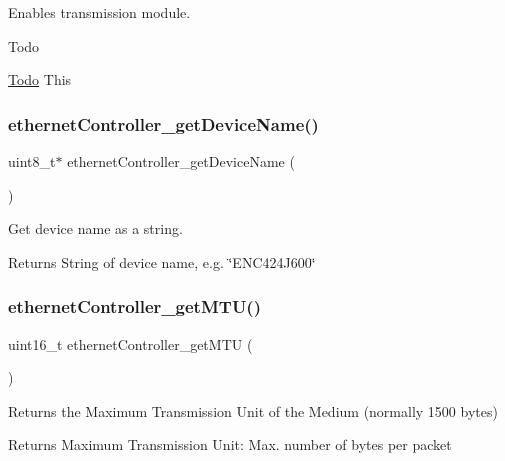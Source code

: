 Enables transmission module. 

\begin{DoxyRefDesc}{Todo}
\item[\mbox{\hyperlink{todo__todo000008}{Todo}}]This \end{DoxyRefDesc}
\mbox{\label{group__init_gae396f51c0fdba634e4e84b5f2b5d9416}} 
\subsubsection{\texorpdfstring{ethernetController\_getDeviceName()}{ethernetController\_getDeviceName()}}
{\footnotesize\ttfamily uint8\+\_\+t$\ast$ ethernet\+Controller\+\_\+get\+Device\+Name (\begin{DoxyParamCaption}{ }\end{DoxyParamCaption})}



Get device name as a string. 

\begin{DoxyReturn}{Returns}
String of device name, e.\+g. \char`\"{}\+E\+N\+C424\+J600\char`\"{} 
\end{DoxyReturn}
\mbox{\label{group__init_gabb37702e7cfbd10dc932ca6502fd7bae}} 
\subsubsection{\texorpdfstring{ethernetController\_getMTU()}{ethernetController\_getMTU()}}
{\footnotesize\ttfamily uint16\+\_\+t ethernet\+Controller\+\_\+get\+M\+TU (\begin{DoxyParamCaption}{ }\end{DoxyParamCaption})}



Returns the Maximum Transmission Unit of the Medium (normally 1500 bytes) 

\begin{DoxyReturn}{Returns}
Maximum Transmission Unit\+: Max. number of bytes per packet 
\end{DoxyReturn}
\mbox{\label{group__init_gaa3396c9822f00c6519a0e7a421048a71}} 
